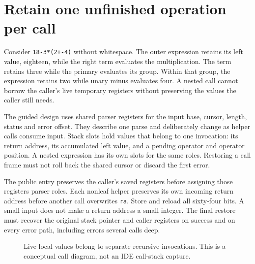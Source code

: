 \section{Retain one unfinished operation per call}\label{expression-frames}
Consider \texttt{18-3*(2+-4)} without whitespace. The outer expression retains its
left value, eighteen, while the right term evaluates the multiplication. The term
retains three while the primary evaluates its group. Within that group, the expression
retains two while unary minus evaluates four. A nested call cannot borrow the caller's
live temporary registers without preserving the values the caller still needs.

The guided design uses shared parser registers for the input base, cursor, length,
status and error offset. They describe one parse and deliberately change as helper
calls consume input. Stack slots hold values that belong to one invocation: its
return address, its accumulated left value, and a pending operator and operator
position. A nested expression has its own slots for the same roles. Restoring a
call frame must not roll back the shared cursor or discard the first error.

The public entry preserves the caller's saved registers before assigning those
registers parser roles. Each nonleaf helper preserves its own incoming return address
before another call overwrites \texttt{ra}. Store and reload all sixty-four bits.
A small input does not make a return address a small integer. The final restore must
recover the original stack pointer and caller registers on success and on every error
path, including errors several calls deep.

\begin{figure}[htbp]
  \centering
  \caption{Live local values belong to separate recursive invocations. This is a conceptual call diagram, not an IDE call-stack capture.}
\end{figure}
